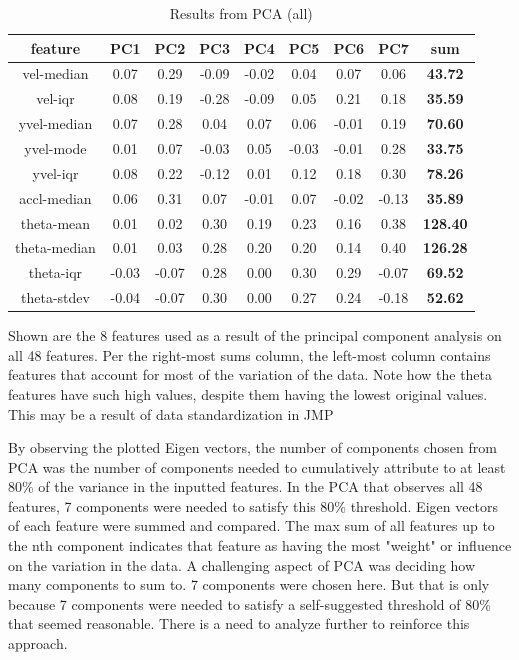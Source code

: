 \begin{table}[h!]
	\centering
	\begin{tabular}{|c|c|c|c|c|c|c|c|c|}
		\hline
		\textbf{feature} & \textbf{PC1} & \textbf{PC2} & \textbf{PC3} & \textbf{PC4} & \textbf{PC5} & \textbf{PC6} & \textbf{PC7} & \textbf{sum} \\
		\hline
		vel-median & 0.07 & 0.29 & -0.09 & -0.02 & 0.04 & 0.07 & 0.06 & \textbf{43.72} \\
		vel-iqr & 0.08 & 0.19 & -0.28 & -0.09 & 0.05 & 0.21 & 0.18 & \textbf{35.59} \\
		yvel-median & 0.07 & 0.28 & 0.04 & 0.07 & 0.06 & -0.01 & 0.19 & \textbf{70.60} \\
		yvel-mode & 0.01 & 0.07 & -0.03 & 0.05 & -0.03 & -0.01 & 0.28 & \textbf{33.75} \\
		yvel-iqr & 0.08 & 0.22 & -0.12 & 0.01 & 0.12 & 0.18 & 0.30 & \textbf{78.26} \\
		accl-median & 0.06 & 0.31 & 0.07 & -0.01 & 0.07 & -0.02 & -0.13 & \textbf{35.89} \\
		theta-mean & 0.01 & 0.02 & 0.30 & 0.19 & 0.23 & 0.16 & 0.38 & \textbf{128.40} \\
		theta-median & 0.01 & 0.03 & 0.28 & 0.20 & 0.20 & 0.14 & 0.40 & \textbf{126.28} \\
		theta-iqr & -0.03 & -0.07 & 0.28 & 0.00 & 0.30 & 0.29 & -0.07 & \textbf{69.52} \\
		theta-stdev & -0.04 & -0.07 & 0.30 & 0.00 & 0.27 & 0.24 & -0.18 & \textbf{52.62} \\
		\hline
	\end{tabular}
	\caption{Results from PCA (all)}
	{\small Shown are the 8 features used as a result of the principal component analysis on all 48 features. Per the right-most sums column, the left-most column contains features that account for most of the variation of the data. Note how the theta features have such high values, despite them having the lowest original values. This may be a result of data standardization in JMP}
	\label{tab:pca-all-results}
\end{table}

By observing the plotted Eigen vectors, the number of components chosen from PCA was the number of components needed to cumulatively attribute to at least 80\% of the variance in the inputted features. In the PCA that observes all 48 features, 7 components were needed to satisfy this 80\% threshold. Eigen vectors of each feature were summed and compared. The max sum of all features up to the nth component indicates that feature as having the most "weight" or influence on the variation in the data. A challenging aspect of PCA was deciding how many components to sum to. 7 components were chosen here. But that is only because 7 components were needed to satisfy a self-suggested threshold of 80\% that seemed reasonable. There is a need to analyze further to reinforce this approach.

